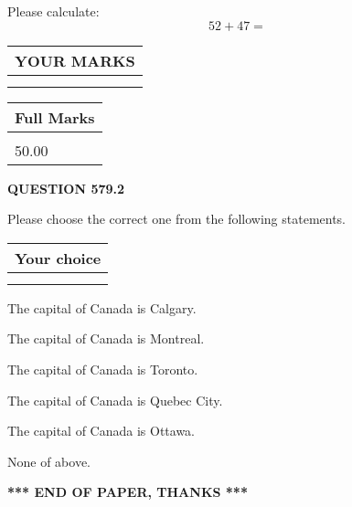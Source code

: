 \documentclass[12pt]{article}
\begin{document}
  
 
Please calculate:
\begin{equation}
52 +  %
47 = \nonumber
\end{equation}
 

 

 
  
\vspace{0.2in}
  
\noindent\begin{tabular}{|l|}
\hline
 YOUR MARKS  \\
\hline
 \\ 
 \\ 
\hline
\end{tabular}
\hspace{0.05in} \begin{tabular}{|l|}
\hline
 Full Marks  \\
\hline
 \\ 
50.00 \\
\hline
\end{tabular}
{\textbf{\Large{QUESTION
579.2 
}}}
  
  
Please choose the correct one from the following statements.
  
  
\noindent\hspace{3.0in} \begin{tabular}{|l|}
\hline
Your choice \\
\hline
 \\ 
 \\ 
\hline
\end{tabular}
  
  
 
 
The capital of Canada is Calgary.
 
 
The capital of Canada is Montreal.
 
 
The capital of Canada is Toronto.
 
 
The capital of Canada is Quebec City.
 
 
The capital of Canada is Ottawa.
 
 
 None of above.
 
 
   
   
 \vspace{0.2in}
 
   
   
   
   
\vspace{1.0in} 
{\textbf{\large{ *** END OF PAPER, THANKS *** }}} 
   
\end{document}
